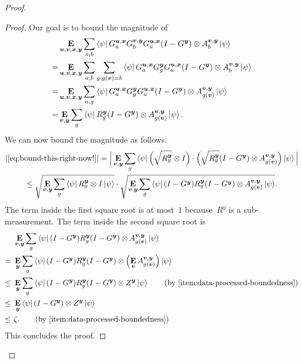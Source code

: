 \begin{proof}
\begin{proof}
	Our goal is to bound the magnitude of
	\begin{align}
	&\mathop{\bf E\/}_{\boldsymbol{u},\boldsymbol{v},{\boldsymbol{x}},\boldsymbol{y}} \sum_{a,b} \bra{\psi} G^{\boldsymbol{u},{\boldsymbol{x}}}_a  G^{\boldsymbol{v},\boldsymbol{y}}_b G^{\boldsymbol{u},{\boldsymbol{x}}}_a (I-G^{\boldsymbol{y}})  \otimes A^{\boldsymbol{v},\boldsymbol{y}}_b \ket{\psi}\nonumber\\
	=&\mathop{\bf E\/}_{\boldsymbol{u},\boldsymbol{v},{\boldsymbol{x}},\boldsymbol{y}} \sum_{a,b} \sum_{g : g(\boldsymbol{v}) = b} \bra{\psi} G^{\boldsymbol{u},{\boldsymbol{x}}}_a  G^{\boldsymbol{y}}_g G^{\boldsymbol{u},{\boldsymbol{x}}}_a (I-G^{\boldsymbol{y}})  \otimes A^{\boldsymbol{v},\boldsymbol{y}}_b \ket{\psi}\nonumber\\
	=&\mathop{\bf E\/}_{\boldsymbol{u},\boldsymbol{v},{\boldsymbol{x}},\boldsymbol{y}} \sum_{a,g}  \bra{\psi} G^{\boldsymbol{u},{\boldsymbol{x}}}_a  G^{\boldsymbol{y}}_g G^{\boldsymbol{u},{\boldsymbol{x}}}_a (I-G^{\boldsymbol{y}})  \otimes A^{\boldsymbol{v},\boldsymbol{y}}_{g(\boldsymbol{v})} \ket{\psi}\nonumber\\
	=& \mathop{\bf E\/}_{\boldsymbol{v},\boldsymbol{y}} \sum_{g} \bra{\psi}R^{\boldsymbol{y}}_g (I-G^{\boldsymbol{y}}) \otimes A^{\boldsymbol{v}, \boldsymbol{y}}_{g(\boldsymbol{v})}  \ket{\psi}.\label{eq:bound-this-right-now!}
	\end{align}
	We can now bound the magnitude as follows.
	\begin{multline*}
	|\eqref{eq:bound-this-right-now!}|
	= \Big| \mathop{\bf E\/}_{\boldsymbol{v},\boldsymbol{y}} \sum_{g} \bra{\psi}\Big(\sqrt{R^{\boldsymbol{y}}_g} \otimes I\Big)
		\cdot  \Big(\sqrt{R^{\boldsymbol{y}}_g} (I-G^{\boldsymbol{y}}) \otimes A^{\boldsymbol{v}, \boldsymbol{y}}_{g(\boldsymbol{v})}\Big)\ket{\psi}\Big|\\
	\leq \sqrt{\mathop{\bf E\/}_{\boldsymbol{v},\boldsymbol{y}} \sum_{g} \bra{\psi}R^{\boldsymbol{y}}_g \otimes I\ket{\psi}}
		\cdot \sqrt{\mathop{\bf E\/}_{\boldsymbol{v},\boldsymbol{y}} \sum_{g}\bra{\psi}(I-G^{\boldsymbol{y}}) R^{\boldsymbol{y}}_g (I-G^{\boldsymbol{y}}) \otimes A^{\boldsymbol{v}, \boldsymbol{y}}_{g(\boldsymbol{v})}\ket{\psi}}.
	\end{multline*}
	The term inside the first square root is at most~$1$ because~$R^y$ is a sub-measurement.
	The term inside the second square root is
	\begin{align*}
	&\E_{\bv,\by} \sum_{g}\bra{\psi}(I-G^{\by}) R^{\by}_g (I-G^{\by}) \otimes A^{\bv, \by}_{g(\bv)}\ket{\psi}\\
	=~&\E_{\by} \sum_{g}\bra{\psi}(I-G^{\by}) R^{\by}_g (I-G^{\by}) \otimes \left(\E_{\bv} A^{\bv, \by}_{g(\bv)}\right)\ket{\psi}\\
	\leq~&\E_{\by} \sum_{g}\bra{\psi}(I-G^{\by}) R^{\by}_g (I-G^{\by}) \otimes Z^{\by}\ket{\psi}\tag{by~\Cref{item:data-processed-boundedness}}\\
	\leq~&\E_{\by} \bra{\psi}(I-G^{\by}) \otimes Z^{\by}\ket{\psi}\\
	\leq~&\zeta.\tag{by~\Cref{item:data-processed-boundedness}}
	\end{align*}
	This concludes the proof.
\end{proof}




\end{proof}
